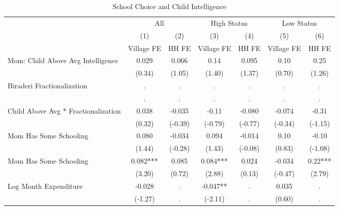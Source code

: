 \begin{table}[htbp]\centering
\def\sym#1{\ifmmode^{#1}\else\(^{#1}\)\fi}
\caption{School Choice and Child Intelligence\label{hhselectioninteraction}}
\begin{tabular}{l*{6}{c}}
\hline\hline
                &\multicolumn{2}{c}{All}  &\multicolumn{2}{c}{High Status}&\multicolumn{2}{c}{Low Status}\\\cmidrule(lr){2-3}\cmidrule(lr){4-5}\cmidrule(lr){6-7}
                &\multicolumn{1}{c}{(1)}&\multicolumn{1}{c}{(2)}&\multicolumn{1}{c}{(3)}&\multicolumn{1}{c}{(4)}&\multicolumn{1}{c}{(5)}&\multicolumn{1}{c}{(6)}\\
                &\multicolumn{1}{c}{Village FE}&\multicolumn{1}{c}{HH FE}&\multicolumn{1}{c}{Village FE}&\multicolumn{1}{c}{HH FE}&\multicolumn{1}{c}{Village FE}&\multicolumn{1}{c}{HH FE}\\
\hline
Mom: Child Above Avg Intelligence&    0.029   &    0.066   &     0.14   &    0.095   &     0.10   &     0.25   \\
                &   (0.34)   &   (1.05)   &   (1.40)   &   (1.37)   &   (0.70)   &   (1.26)   \\
Biraderi Fractionalization&        .   &        .   &        .   &        .   &        .   &        .   \\
                &        .   &        .   &        .   &        .   &        .   &        .   \\
Child Above Avg * Fractionalization&    0.038   &   -0.035   &    -0.11   &   -0.080   &   -0.074   &    -0.31   \\
                &   (0.32)   &  (-0.39)   &  (-0.79)   &  (-0.77)   &  (-0.34)   &  (-1.15)   \\
Mom Has Some Schooling&    0.080   &   -0.034   &    0.094   &   -0.014   &     0.10   &    -0.10   \\
                &   (1.44)   &  (-0.28)   &   (1.43)   &  (-0.08)   &   (0.83)   &  (-1.08)   \\
Mom Has Some Schooling&    0.082***&    0.085   &    0.084***&    0.024   &   -0.034   &     0.22***\\
                &   (3.20)   &   (0.72)   &   (2.88)   &   (0.13)   &  (-0.47)   &   (2.79)   \\
Log Month Expenditure&   -0.028   &        .   &   -0.047** &        .   &    0.035   &        .   \\
                &  (-1.27)   &        .   &  (-2.11)   &        .   &   (0.60)   &        .   \\

\end{tabular}
\end{table}
